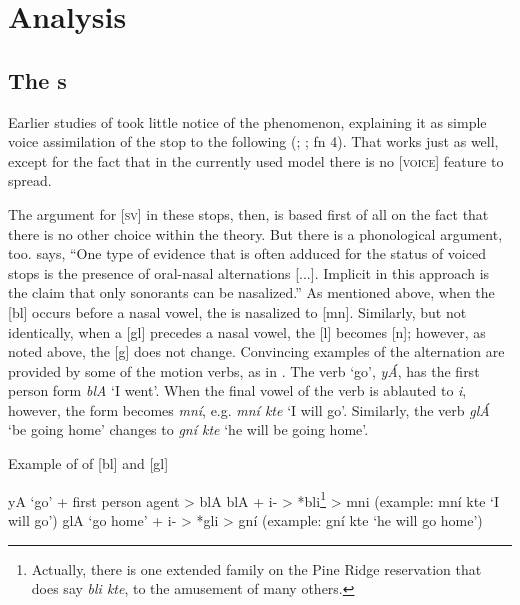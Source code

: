 \documentclass[output=paper]{LSP/langsci}
\begin{document}
\section{Analysis}

\subsection{The s}

Earlier studies of   took little notice of the  phenomenon, explaining it as simple voice assimilation of the stop to the following  (\citealt[37]{Carter1974}; \citealt[7]{Shaw1980}; \citealt[22]{Patterson1990} fn 4). That works just as well, except for the fact that in the currently used model there is no [\textsc{voice}] feature to spread.

The argument for [\textsc{sv}] in these stops, then, is based first of all on the fact that there is no other choice within the theory. But there is a phonological argument, too. \citet[180]{Botma2011} says, ``One type of evidence that is often adduced for the  status of voiced stops is the presence of oral-nasal alternations [...]. Implicit in this approach is the claim that only sonorants can be nasalized.'' As mentioned above, when the [bl]  occurs before a nasal vowel, the  is nasalized to [mn]. Similarly, but not identically, when a [gl]  precedes a nasal vowel, the [l] becomes [n]; however, as noted above, the [g] does not change. Convincing examples of the alternation are provided by some of the motion verbs, as in . The verb `go', \textit{yÁ}, has the first person form \textit{blA} `I went'. When the final vowel of the verb is ablauted to \textit{i}, however, the form becomes \textit{mní}, e.g. \textit{mní kte} `I will go'. Similarly, the verb \textit{glÁ} `be going home' changes to \textit{gní kte} `he will be going home'.

\begin{exe}
\ex \label{ex:rood:9}
Example of  of [bl] and [gl]
\begin{xlist}
\ex yA `go' + first person agent > blA
\ex blA + i- > *bli\footnote{Actually, there is one extended family on the Pine Ridge reservation that does say \textit{bli kte}, to the amusement of many others.} > mni (example: mní kte `I will go')
\ex glA `go home' + i- > *gli > gní (example: gní kte `he will go home')
\end{xlist}
\end{exe}
\end{document}
